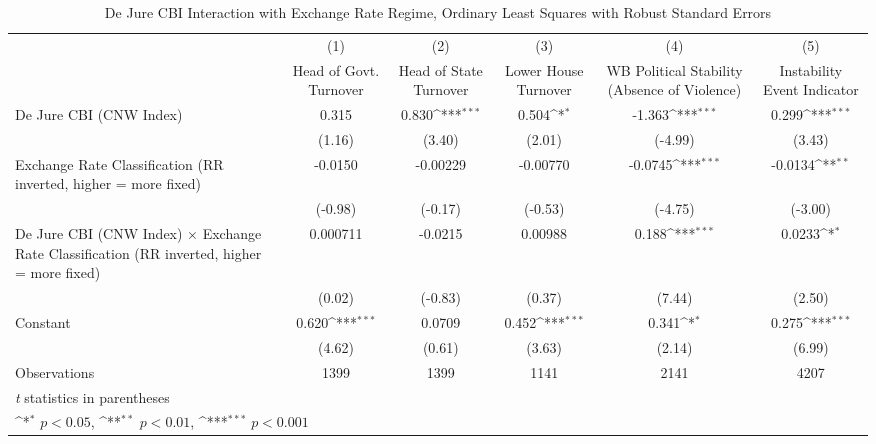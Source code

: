 \begin{table}[htbp]\centering
\def\sym#1{\ifmmode^{#1}\else\(^{#1}\)\fi}
\caption{De Jure CBI Interaction with Exchange Rate Regime, Ordinary Least Squares with Robust Standard Errors \label{imultIndOLSDJ}}
\begin{tabular*}{\linewidth}{@{\hskip\tabcolsep\extracolsep\fill}l*{5}{c}}
\toprule
                &\multicolumn{1}{c}{(1)}&\multicolumn{1}{c}{(2)}&\multicolumn{1}{c}{(3)}&\multicolumn{1}{c}{(4)}&\multicolumn{1}{c}{(5)}\\
                &\multicolumn{1}{c}{Head of Govt. Turnover}&\multicolumn{1}{c}{Head of State Turnover}&\multicolumn{1}{c}{Lower House Turnover}&\multicolumn{1}{c}{WB Political Stability (Absence of Violence)}&\multicolumn{1}{c}{Instability Event Indicator}\\
\midrule
De Jure CBI (CNW Index)&    0.315         &    0.830\sym{***}&    0.504\sym{*}  &   -1.363\sym{***}&    0.299\sym{***}\\
                &   (1.16)         &   (3.40)         &   (2.01)         &  (-4.99)         &   (3.43)         \\
\addlinespace
Exchange Rate Classification (RR inverted, higher = more fixed)&  -0.0150         & -0.00229         & -0.00770         &  -0.0745\sym{***}&  -0.0134\sym{**} \\
                &  (-0.98)         &  (-0.17)         &  (-0.53)         &  (-4.75)         &  (-3.00)         \\
\addlinespace
De Jure CBI (CNW Index) $\times$ Exchange Rate Classification (RR inverted, higher = more fixed)& 0.000711         &  -0.0215         &  0.00988         &    0.188\sym{***}&   0.0233\sym{*}  \\
                &   (0.02)         &  (-0.83)         &   (0.37)         &   (7.44)         &   (2.50)         \\
\addlinespace
Constant        &    0.620\sym{***}&   0.0709         &    0.452\sym{***}&    0.341\sym{*}  &    0.275\sym{***}\\
                &   (4.62)         &   (0.61)         &   (3.63)         &   (2.14)         &   (6.99)         \\
\midrule
Observations    &     1399         &     1399         &     1141         &     2141         &     4207         \\
\bottomrule
\multicolumn{6}{l}{\footnotesize \textit{t} statistics in parentheses}\\
\multicolumn{6}{l}{\footnotesize \sym{*} \(p<0.05\), \sym{**} \(p<0.01\), \sym{***} \(p<0.001\)}\\
\end{tabular*}
\end{table}
